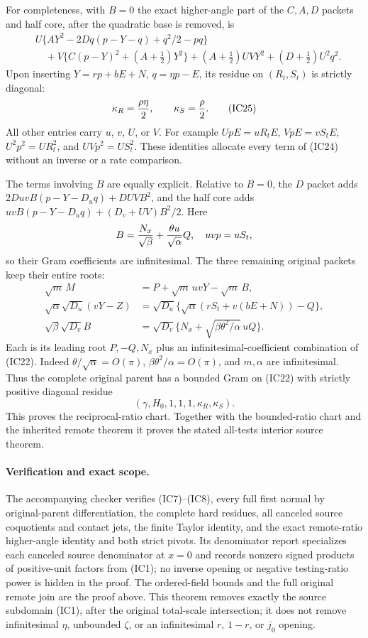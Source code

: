 For completeness, with $B=0$ the exact higher-angle part of the
$C,A,D$ packets and half core, after the quadratic base is removed, is
\[
\begin{split}
 &U\{AY^2-2Dq(p-Y-q)+q^2/2-pq\}\\
 &\quad+V\{C(p-Y)^2+(A+\tfrac12)Y^2\}
 +(A+\tfrac12)UVY^2+(D+\tfrac12)U^2q^2.               \end{split} \tag{IC24}
\]
Upon inserting $Y=rp+bE+N$, $q=\eta p-E$, its residue on
$(R_t,S_t)$ is strictly diagonal:
\[
 \kappa_R={\rho\eta\over2},\qquad
 \kappa_S={\rho\over2}.                              \tag{IC25}
\]
All other entries carry $u$, $v$, $U$, or $V$. For example
$UpE=uR_tE$, $VpE=vS_tE$, $U^2p^2=UR_t^2$, and
$UVp^2=US_t^2$. These identities allocate every term of (IC24)
without an inverse or a rate comparison.

The terms involving $B$ are equally explicit. Relative to $B=0$, the
$D$ packet adds $2DuvB(p-Y-D_uq)+DUVB^2$, and the half core adds
$uvB(p-Y-D_uq)+(D_v+UV)B^2/2$.
Here
\[
 B={N_x\over\sqrt\beta}+{\theta u\over\sqrt\alpha}Q,
 \quad uvp=uS_t,
\]
so their Gram coefficients are infinitesimal. The three remaining
original packets keep their entire roots:
\[
\begin{aligned}
 \sqrt m\,M&=P+\sqrt m\,uvY-\sqrt m\,B,\\
 \sqrt\alpha\sqrt{D_u}(vY-Z)
  &=\sqrt{D_u}\{\sqrt\alpha(rS_t+v(bE+N))-Q\},\\
 \sqrt\beta\sqrt{D_v}B
  &=\sqrt{D_v}\{N_x+\sqrt{\beta\theta^2/\alpha}\,uQ\}.
\end{aligned}                                                   \tag{IC26}
\]
Each is its leading root $P,-Q,N_x$ plus an infinitesimal-coefficient
combination of (IC22). Indeed $\theta/\sqrt\alpha=O(\pi)$,
$\beta\theta^2/\alpha=O(\pi)$, and $m,\alpha$ are infinitesimal.
Thus the complete original parent has a bounded Gram on (IC22) with
strictly positive diagonal residue
\[
             (\gamma,H_0,1,1,1,\kappa_R,\kappa_S).
                                                               \tag{IC27}
\]
This proves the reciprocal-ratio chart. Together with the bounded-ratio
chart and the inherited remote theorem it proves the stated all-tests
interior source theorem.

\paragraph{Verification and exact scope.}
The accompanying checker verifies (IC7)--(IC8), every full first
normal by original-parent differentiation, the complete hard residues,
all canceled source coquotients and contact jets, the finite Taylor
identity, and the exact remote-ratio higher-angle identity and both
strict pivots. Its denominator report specializes each canceled
source denominator at $x=0$ and records nonzero signed products of
positive-unit factors
from (IC1); no inverse opening or negative testing-ratio power is
hidden in the proof. The ordered-field bounds and the full original
remote join are the proof above. This theorem removes exactly the
source subdomain (IC1), after the original total-scale intersection;
it does not remove infinitesimal $\eta$, unbounded $\zeta$, or an
infinitesimal $r$, $1-r$, or $j_0$ opening.
